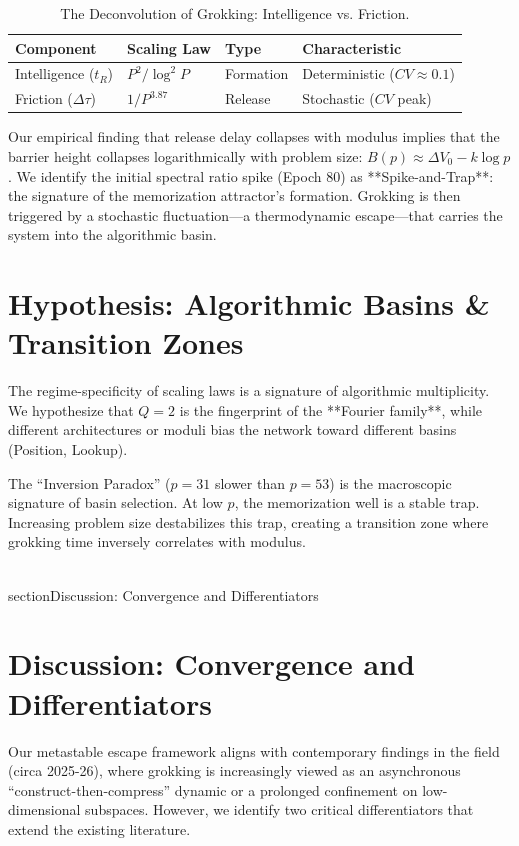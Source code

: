 \documentclass[11pt]{article}
\begin{document}
\begin{table}[h!]
\centering
\begin{tabular}{@{}llll@{}} \toprule
\textbf{Component} & \textbf{Scaling Law} & \textbf{Type} & \textbf{Characteristic} \\ \midrule
Intelligence ($t_R$) & $P^2 / \log^2 P$ & Formation & Deterministic ($CV \approx 0.1$) \\
Friction ($\Delta \tau$) & $1 / P^{3.87}$ & Release & Stochastic ($CV$ peak) \\ \bottomrule
\end{tabular}
\caption{The Deconvolution of Grokking: Intelligence vs. Friction.}
\end{table}

Our empirical finding that release delay collapses with modulus implies that the barrier height collapses logarithmically with problem size: $B(p) \approx \Delta V_0 - k \log p$. We identify the initial spectral ratio spike (Epoch 80) as **Spike-and-Trap**: the signature of the memorization attractor's formation. Grokking is then triggered by a stochastic fluctuation—a thermodynamic escape—that carries the system into the algorithmic basin. 

\section{Hypothesis: Algorithmic Basins & Transition Zones}
The regime-specificity of scaling laws is a signature of algorithmic multiplicity. We hypothesize that $Q=2$ is the fingerprint of the **Fourier family**, while different architectures or moduli bias the network toward different basins (Position, Lookup). 

The ``Inversion Paradox'' ($p=31$ slower than $p=53$) is the macroscopic signature of basin selection. At low $p$, the memorization well is a stable trap. Increasing problem size destabilizes this trap, creating a transition zone where grokking time inversely correlates with modulus.

\\section{Discussion: Convergence and Differentiators}
\section{Discussion: Convergence and Differentiators}
Our metastable escape framework aligns with contemporary findings in the field (circa 2025-26), where grokking is increasingly viewed as an asynchronous ``construct-then-compress'' dynamic or a prolonged confinement on low-dimensional subspaces. However, we identify two critical differentiators that extend the existing literature.
\end{document}
